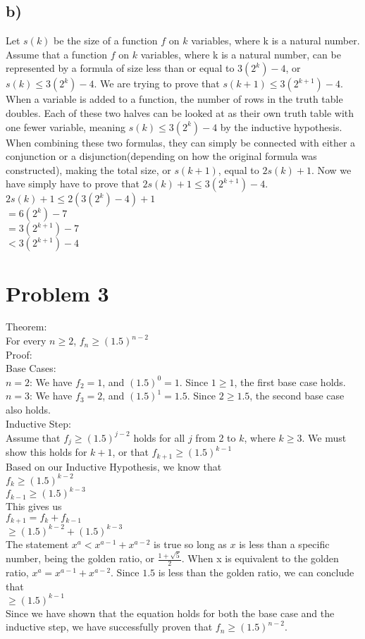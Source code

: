 \documentclass{article}
\begin{document}
\subsection*{b)}
Let $s(k)$ be the size of a function $f$ on $k$ variables, where k is a natural number. Assume that a function $f$ on $k$ variables, where k is a natural number, can be represented by a formula of size less than or equal to $3(2^k)-4$, or $s(k)\leq 3(2^k)-4$.  We are trying to prove that $s(k+1) \leq 3(2^{k+1})-4$. When a variable is added to a function, the number of rows in the truth table doubles. Each of these two halves can be looked at as their own truth table with one fewer variable, meaning $s(k)\leq 3(2^k)-4$ by the inductive hypothesis. When combining these two formulas, they can simply be connected with either a conjunction or a disjunction(depending on how the original formula was constructed), making the total size, or $s(k+1)$, equal to $2s(k)+1$. Now we have simply have to prove that $2s(k)+1\leq 3(2^{k+1})-4$.\\
$2s(k)+1\leq2(3(2^k)-4)+1$\\
$=6(2^k)-7$\\
$=3(2^{k+1})-7$\\
$<3(2^{k+1})-4$
\clearpage
\section*{Problem 3}
Theorem:\\
For every $n\geq 2$, $f_n\geq (1.5)^{n-2}$\\
Proof:\\
Base Cases:\\
$n=2$: We have $f_2=1$, and $(1.5)^0=1$. Since $1\geq 1$, the first base case holds.\\
$n=3$: We have $f_3=2$, and $(1.5)^1=1.5$. Since $2\geq 1.5$, the second base case also holds.\\
Inductive Step:\\
Assume that $f_j \geq (1.5)^{j-2}$ holds for all $j$ from 2 to $k$, where $k\geq 3$. We must show this holds for $k+1$, or that 
$f_{k+1}\geq (1.5)^{k-1}$\\
Based on our Inductive Hypothesis, we know that\\
$f_k\geq(1.5)^{k-2}$\\
$f_{k-1}\geq(1.5)^{k-3}$\\
This gives us\\
$f_{k+1}=f_k+f_{k-1}$\\
$\geq (1.5)^{k-2}+(1.5)^{k-3}$\\
The statement $x^a < x^{a-1}+x^{a-2}$ is true so long as $x$ is less than a specific number, being the golden ratio, or $\frac{1+\sqrt{5}}{2}$. When x is equivalent to the golden ratio, $x^a = x^{a-1}+x^{a-2}$. Since $1.5$ is less than the golden ratio, we can conclude that\\
$\geq(1.5)^{k-1}$\\
Since we have shown that the equation holds for both the base case and the inductive step, we have successfully proven that $f_n\geq (1.5)^{n-2}$.
\clearpage
\end{document}

